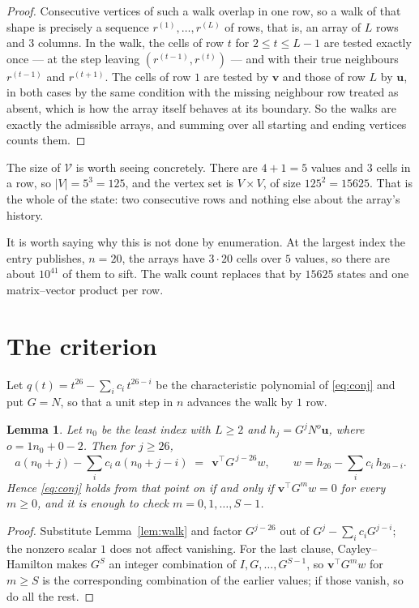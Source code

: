 \documentclass[11pt,a4paper]{article}
\theoremstyle{plain}
\newtheorem{lemma}[theorem]{Lemma}
\theoremstyle{definition}
\begin{document}
\begin{proof}
Consecutive vertices of such a walk overlap in one row, so a walk of that shape is
precisely a sequence $r^{(1)},\dots,r^{(L)}$ of rows, that is, an array of $L$ rows
and $3$ columns. In the walk, the cells of row $t$ for $2\le t\le L-1$ are tested
exactly once --- at the step leaving $(r^{(t-1)},r^{(t)})$ --- and with their true
neighbours $r^{(t-1)}$ and $r^{(t+1)}$. The cells of row $1$ are tested by
$\mathbf{v}$ and those of row $L$ by $\mathbf{u}$, in both cases by the same condition
with the missing neighbour row treated as absent, which is how the array itself behaves at
its boundary. So the walks are exactly the admissible arrays, and summing over all starting
and ending vertices counts them.
\end{proof}


The size of $\mathcal V$ is worth seeing concretely. There are $4+1=5$ values
and $3$ cells in a row, so $|V|=5^{3}=125$, and the vertex set is
$V\times V$, of size $125^2=15625$. That is the whole of the state: two consecutive
rows and nothing else about the array's history.

It is worth saying why this is not done by enumeration. At the largest index the entry
publishes, $n=20$, the arrays have $3\cdot20$ cells over
$5$ values, so there are about $10^{41}$ of them to sift. The
walk count replaces that by $15625$ states and one matrix--vector product per row.
\section{The criterion}

Let $q(t)=t^{26}-\sum_i c_i\,t^{26-i}$ be the characteristic polynomial of
\eqref{eq:conj} and put $G=N$, so that a unit step in $n$ advances the walk by
$1$ row.

\begin{lemma}\label{lem:crit}
Let $n_0$ be the least index with $L\ge2$ and $h_j=G^{j}N^{o}\mathbf{u}$, where
$o=1n_0+0-2$. Then for $j\ge26$,
\[
a(n_0+j)-\sum_i c_i\,a(n_0+j-i)\;=\;\,\mathbf{v}^{\!\top}G^{\,j-26}w,
\qquad w=h_{26}-\sum_i c_i\,h_{26-i} .
\]
Hence \eqref{eq:conj} holds from that point on if and only if
$\mathbf{v}^{\!\top}G^{m}w=0$ for every $m\ge0$, and it is enough to check
$m=0,1,\dots,S-1$.
\end{lemma}

\begin{proof}
Substitute Lemma~\ref{lem:walk} and factor $G^{j-26}$ out of
$G^{j}-\sum_ic_iG^{j-i}$; the nonzero scalar $1$ does not affect
vanishing. For the last clause, Cayley--Hamilton makes $G^{S}$ an integer combination of
$I,G,\dots,G^{S-1}$, so $\mathbf{v}^{\!\top}G^{m}w$ for $m\ge S$ is the corresponding
combination of the earlier values; if those vanish, so do all the rest.
\end{proof}
\end{document}
